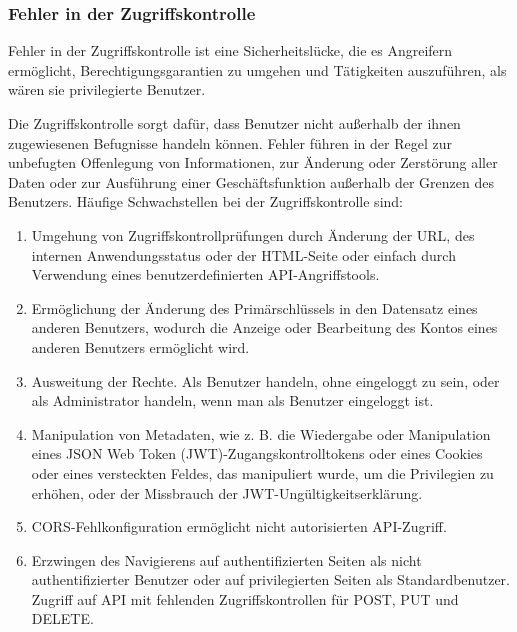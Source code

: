 \subsubsection{Fehler in der Zugriffskontrolle}

Fehler in der Zugriffskontrolle ist eine Sicherheitslücke,
die es Angreifern ermöglicht, Berechtigungsgarantien zu
umgehen und Tätigkeiten auszuführen, als wären sie
privilegierte Benutzer.

Die Zugriffskontrolle sorgt dafür, dass Benutzer nicht
außerhalb der ihnen zugewiesenen Befugnisse handeln
können. Fehler führen in der Regel zur unbefugten
Offenlegung von Informationen, zur Änderung oder Zerstörung
aller Daten oder zur Ausführung einer Geschäftsfunktion
außerhalb der Grenzen des Benutzers. Häufige Schwachstellen
bei der Zugriffskontrolle sind:

\begin{enumerate}
    \item Umgehung von Zugriffskontrollprüfungen durch
    Änderung der URL, des internen Anwendungsstatus oder
    der HTML-Seite oder einfach durch Verwendung eines
    benutzerdefinierten API-Angriffstools.

    \item Ermöglichung der Änderung des Primärschlüssels
    in den Datensatz eines anderen Benutzers, wodurch
    die Anzeige oder Bearbeitung des Kontos eines anderen
    Benutzers ermöglicht wird.

    \item Ausweitung der Rechte. Als Benutzer handeln, ohne
    eingeloggt zu sein, oder als Administrator handeln, wenn
    man als Benutzer eingeloggt ist.

    \item Manipulation von Metadaten, wie z. B. die
    Wiedergabe oder Manipulation eines JSON Web Token
    (JWT)-Zugangskontrolltokens oder eines Cookies oder
    eines versteckten Feldes, das manipuliert wurde, um
    die Privilegien zu erhöhen, oder der Missbrauch der
    JWT-Ungültigkeitserklärung.

    \item CORS-Fehlkonfiguration ermöglicht
    nicht autorisierten API-Zugriff.

    \item Erzwingen des Navigierens auf authentifizierten
    Seiten als nicht authentifizierter Benutzer oder
    auf privilegierten Seiten als Standardbenutzer.
    Zugriff auf API mit fehlenden Zugriffskontrollen
    für POST, PUT und DELETE.
\end{enumerate}
